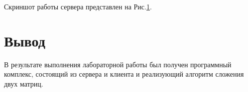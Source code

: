 \documentclass[russian,utf8,pointsection]{eskdtext}
\begin{document}
       	Скриншот работы сервера представлен на Рис.\ref{ris:1-4}.
       	\begin{figure}[!h]
       		\caption{}
       		\label{ris:1-4}
       	\end{figure}
       	       	
	\section{Вывод}
	В результате выполнения лабораторной работы был получен программный комплекс, состоящий из сервера и клиента и реализующий алгоритм сложения двух матриц.
		
\end{document}
